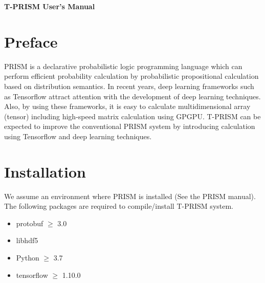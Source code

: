 \documentclass[a4paper]{report}
\begin{document}
	\begin{center}
		\par\vspace*{3cm}\par
		{\Huge\bf T-PRISM User's Manual}\par\vspace*{0.5cm}\par
		{\Large }\par\vspace*{12cm}\par
		
		
		
		\par\vspace*{2cm}\par
		
	\end{center}
	\thispagestyle{empty}
	\setcounter{page}{0}%
	\clearpage
	
	
\section*{Preface}

PRISM is a declarative probabilistic logic programming language which can perform efficient probability calculation by probabilistic propositional calculation based on distribution semantics.
In recent years, deep learning frameworks such as Tensorflow attract attention with the development of deep learning techniques.
Also, by using these frameworks, it is easy to calculate multidimensional array (tensor) including high-speed matrix calculation using GPGPU.
T-PRISM  can be expected to improve the conventional PRISM system by introducing calculation using Tensorflow and deep learning techniques.

\section*{Installation}
We assume an environment where PRISM is installed (See the PRISM manual).
The following packages are required to compile/install T-PRISM system.
\begin{itemize}
	\item protobuf   $\geq$ 3.0
	\item libhdf5    
	\item Python     $\geq$ 3.7
	\item tensorflow $\geq$ 1.10.0
\end{itemize}
\end{document}

